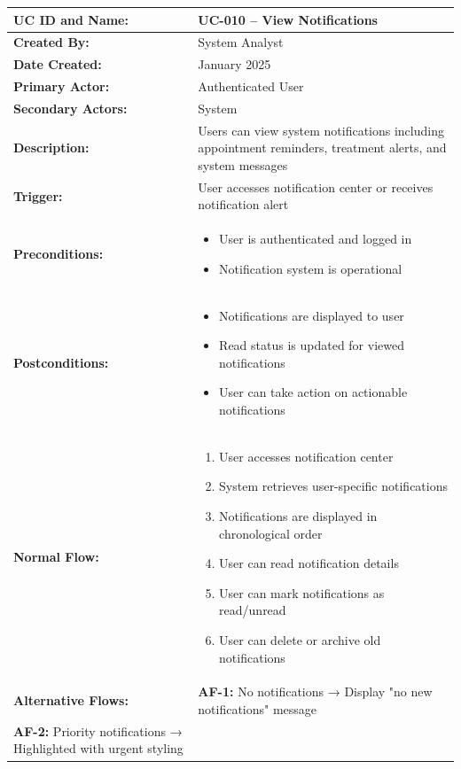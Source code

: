 \documentclass[12pt,a4paper]{article}
\begin{document}
\renewcommand{\arraystretch}{1.5}
\begin{longtable}{|p{4.5cm}|p{10.5cm}|}
\hline
\textbf{UC ID and Name:} & UC-010 – View Notifications \\
\hline
\textbf{Created By:} & System Analyst \\
\hline
\textbf{Date Created:} & January 2025 \\
\hline
\textbf{Primary Actor:} & Authenticated User \\
\hline
\textbf{Secondary Actors:} & System \\
\hline
\textbf{Description:} & Users can view system notifications including appointment reminders, treatment alerts, and system messages \\
\hline
\textbf{Trigger:} & User accesses notification center or receives notification alert \\
\hline
\textbf{Preconditions:} &
\begin{itemize}
  \item User is authenticated and logged in
  \item Notification system is operational
\end{itemize} \\
\hline
\textbf{Postconditions:} &
\begin{itemize}
  \item Notifications are displayed to user
  \item Read status is updated for viewed notifications
  \item User can take action on actionable notifications
\end{itemize} \\
\hline
\textbf{Normal Flow:} &
\begin{enumerate}
  \item User accesses notification center
  \item System retrieves user-specific notifications
  \item Notifications are displayed in chronological order
  \item User can read notification details
  \item User can mark notifications as read/unread
  \item User can delete or archive old notifications
\end{enumerate} \\
\hline
\textbf{Alternative Flows:} &
\textbf{AF-1:} No notifications → Display "no new notifications" message \\
\textbf{AF-2:} Priority notifications → Highlighted with urgent styling \\

\end{longtable}
\end{document}
